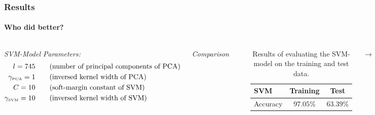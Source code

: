 \documentclass[10pt,usepdftitle=false,aspectratio=169]{beamer}
\begin{document}
\begin{frame}\frametitle{Results}
    \framesubtitle{Who did better?}
	\begin{columns}
	
	


		
		\vspace{0.5em}
	
\emph{SVM-Model Parameters:}
		\begin{align*}
			l = 745 \qquad &\text{(number of principal components of PCA)}\\
			\gamma_{\text{\tiny PCA}} =  1 \qquad &\text{(inversed kernel width of PCA)}\\
			C = 10 \qquad &\text{(soft-margin constant of SVM)}\\
			\gamma_{\text{\tiny SVM}} = 10 \qquad &\text{(inversed kernel width of SVM)}
			\end{align*}

\vspace{1em}
		\vspace{.1em}
	
		\emph{Comparison }
		\begin{table}[htbp]
		  \centering
		  \label{tbl:timeline}
		  \begin{tabular}{l c c}
			\toprule
			SVM&  Training& Test\\
			\midrule
			Accuracy & $ 97.05\%$ & $63.39\%$\\
			
		  
			\bottomrule
		  \end{tabular}
		  \caption{Results of evaluating the SVM-model on the training and  test data.}
		  \end{table}%

		  $\rightarrow$ %
		\end{columns}

	
		
	\end{frame}



    
    
\end{document}
